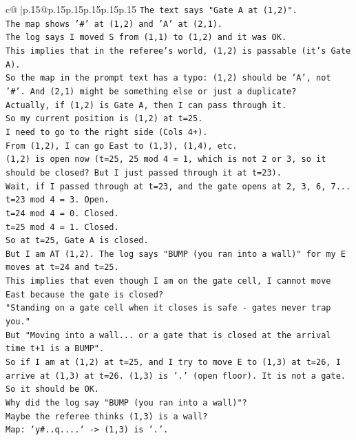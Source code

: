 \documentclass{article}
\begin{document}
{\begin{supertabular}{c@{$\;$}|p{.15\linewidth}@{}p{.15\linewidth}p{.15\linewidth}p{.15\linewidth}p{.15\linewidth}p{.15\linewidth}}
{{{\texttt{The text says "Gate A at (1,2)".} \\
\texttt{The map shows '\#' at (1,2) and 'A' at (2,1).} \\
\texttt{The log says I moved S from (1,1) to (1,2) and it was OK.} \\
\texttt{This implies that in the referee's world, (1,2) is passable (it's Gate A).} \\
\texttt{So the map in the prompt text has a typo: (1,2) should be 'A', not '\#'. And (2,1) might be something else or just a duplicate?} \\
\texttt{Actually, if (1,2) is Gate A, then I can pass through it.} \\
\texttt{So my current position is (1,2) at t=25.} \\
\texttt{I need to go to the right side (Cols 4+).} \\
\texttt{From (1,2), I can go East to (1,3), (1,4), etc.} \\
\texttt{(1,2) is open now (t=25, 25 mod 4 = 1, which is not 2 or 3, so it should be closed? But I just passed through it at t=23).} \\
\texttt{Wait, if I passed through at t=23, and the gate opens at 2, 3, 6, 7...} \\
\texttt{t=23 mod 4 = 3. Open.} \\
\texttt{t=24 mod 4 = 0. Closed.} \\
\texttt{t=25 mod 4 = 1. Closed.} \\
\texttt{So at t=25, Gate A is closed.} \\
\texttt{But I am AT (1,2). The log says "BUMP (you ran into a wall)" for my E moves at t=24 and t=25.} \\
\texttt{This implies that even though I am on the gate cell, I cannot move East because the gate is closed?} \\
\texttt{"Standing on a gate cell when it closes is safe {-} gates never trap you."} \\
\texttt{But "Moving into a wall... or a gate that is closed at the arrival time t+1 is a BUMP".} \\
\texttt{So if I am at (1,2) at t=25, and I try to move E to (1,3) at t=26, I arrive at (1,3) at t=26. (1,3) is '.' (open floor). It is not a gate. So it should be OK.} \\
\texttt{Why did the log say "BUMP (you ran into a wall)"?} \\
\texttt{Maybe the referee thinks (1,3) is a wall?} \\
\texttt{Map: `y\#..q....` {-}> (1,3) is '.'.} \\
}}}
\end{supertabular}}
\end{document}
